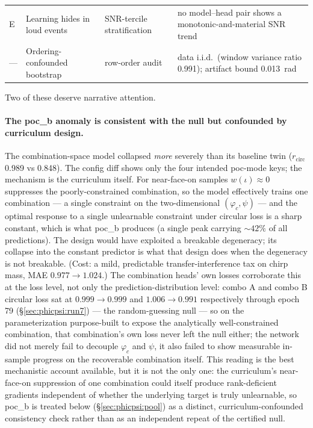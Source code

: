 \begin{table}[tbp]
{\begin{tabular}{@{}llll@{}}
        E   & Learning hides in loud events       & SNR-tercile stratification            & no model--head pair shows a monotonic-and-material SNR trend                                                                                                                                         \\
        --- & Ordering-confounded bootstrap       & row-order audit                       & data i.i.d.\ (window variance ratio 0.991); artifact bound \SI{0.013}{\radian}                                                                                                                                \\
        \bottomrule
    \end{tabular}
    }
\end{table}

Two of these deserve narrative attention.

\paragraph{The poc\_b anomaly is consistent with the null but confounded by curriculum design.}
The combination-space model collapsed \emph{more} severely than its baseline twin ($r_{\mathrm{circ}}$ 0.989 vs 0.848).
The config diff shows only the four intended poc-mode keys; the mechanism is the curriculum itself.
For near-face-on samples $w(\iota) \approx 0$ suppresses the poorly-constrained combination, so the model effectively trains one combination --- a single constraint on the two-dimensional $(\varphi_c, \psi)$ --- and the optimal response to a single unlearnable constraint under circular loss is a sharp constant, which is what poc\_b produces (a single peak carrying ${\sim}42\%$ of all predictions).
The design would have exploited a breakable degeneracy; its collapse into the constant predictor is what that design does when the degeneracy is not breakable.
(Cost: a mild, predictable transfer-interference tax on chirp mass, MAE $0.977 \to 1.024$.)
The combination heads' own losses corroborate this at the loss level, not only the prediction-distribution level: combo A and combo B circular loss sat at $0.999 \to 0.999$ and $1.006 \to 0.991$ respectively through epoch 79 (\S\ref{sec:phicpsi:run7}) --- the random-guessing null --- so on the parameterization purpose-built to expose the analytically well-constrained combination, that combination's own loss never left the null either; the network did not merely fail to decouple $\varphi_c$ and $\psi$, it also failed to show measurable in-sample progress on the recoverable combination itself.
This reading is the best mechanistic account available, but it is not the only one: the curriculum's near-face-on suppression of one combination could itself produce rank-deficient gradients independent of whether the underlying target is truly unlearnable, so poc\_b is treated below (\S\ref{sec:phicpsi:pool}) as a distinct, curriculum-confounded consistency check rather than as an independent repeat of the certified null.

